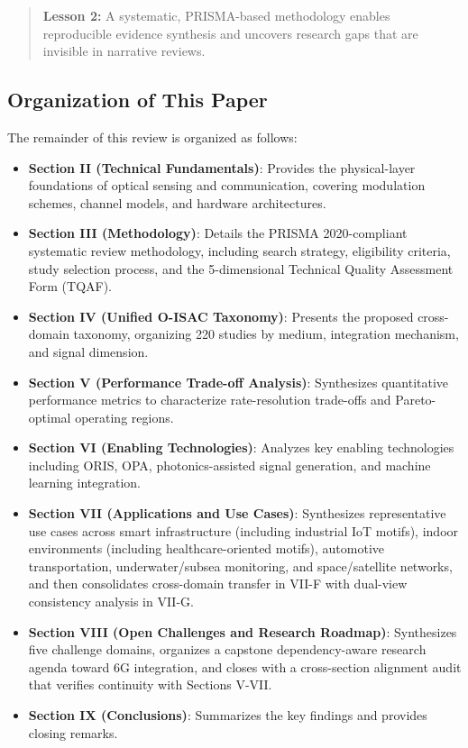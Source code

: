\begin{quote}
\textbf{Lesson 2:} A systematic, PRISMA-based methodology enables reproducible evidence synthesis and uncovers research gaps that are invisible in narrative reviews.
\end{quote}

\subsection{Organization of This Paper}

The remainder of this review is organized as follows:

\begin{itemize}
    \item \textbf{Section II (Technical Fundamentals)}: Provides the physical-layer foundations of optical sensing and communication, covering modulation schemes, channel models, and hardware architectures.
    \item \textbf{Section III (Methodology)}: Details the PRISMA 2020-compliant systematic review methodology, including search strategy, eligibility criteria, study selection process, and the 5-dimensional Technical Quality Assessment Form (TQAF).
    \item \textbf{Section IV (Unified O-ISAC Taxonomy)}: Presents the proposed cross-domain taxonomy, organizing 220 studies by medium, integration mechanism, and signal dimension.
    \item \textbf{Section V (Performance Trade-off Analysis)}: Synthesizes quantitative performance metrics to characterize rate-resolution trade-offs and Pareto-optimal operating regions.
    \item \textbf{Section VI (Enabling Technologies)}: Analyzes key enabling technologies including ORIS, OPA, photonics-assisted signal generation, and machine learning integration.
    \item \textbf{Section VII (Applications and Use Cases)}: Synthesizes representative use cases across smart infrastructure (including industrial IoT motifs), indoor environments (including healthcare-oriented motifs), automotive transportation, underwater/subsea monitoring, and space/satellite networks, and then consolidates cross-domain transfer in VII-F with dual-view consistency analysis in VII-G.
    \item \textbf{Section VIII (Open Challenges and Research Roadmap)}: Synthesizes five challenge domains, organizes a capstone dependency-aware research agenda toward 6G integration, and closes with a cross-section alignment audit that verifies continuity with Sections V-VII.
    \item \textbf{Section IX (Conclusions)}: Summarizes the key findings and provides closing remarks.
\end{itemize}

